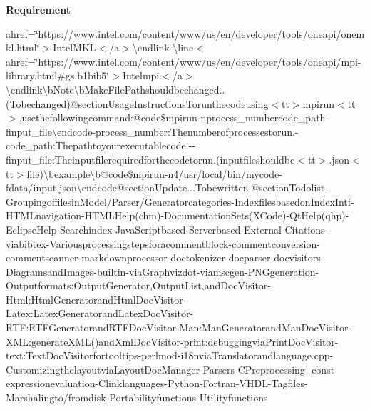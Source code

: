 {\bfseries Requirement} {\bfseries } 
\begin{DoxyItemize}
\item ahref=\char`\"{}https\-://www.\-intel.\-com/content/www/us/en/developer/tools/oneapi/onemkl.\-html\char`\"{}$>$\-IntelM\-K\-L$<$/a$>$\textbackslash{}endlink-\/\textbackslash{}line$<$ahref=\char`\"{}https\-://www.\-intel.\-com/content/www/us/en/developer/tools/oneapi/mpi-\/library.\-html\#gs.\-b1bib5\char`\"{}$>$\-Intelmpi$<$/a$>$\textbackslash{}endlink\textbackslash{}bNote\textbackslash{}bMake\-FilePathshouldbechanged..(\-Tobechanged)@sectionUsageInstructionsTorunthecodeusing$<$tt$>$mpirun$<$tt$>$,usethefollowingcommand\-:@code\$mpirun-\/nprocess\-\_\-numbercode\-\_\-path-\/finput\-\_\-file\textbackslash{}endcode-\/process\-\_\-number\-:Thenumberofprocessestorun.-\/code\-\_\-path\-:Thepathtoyourexecutablecode.-\/-\/finput\-\_\-file\-:Theinputfilerequiredforthecodetorun.(inputfileshouldbe$<$tt$>$.\-json$<$tt$>$file)\textbackslash{}bexample\textbackslash{}b@code\$mpirun-\/n4/usr/local/bin/mycode-\/fdata/input.\-json\textbackslash{}endcode@sectionUpdate...Tobewritten.@sectionTodolist-\/GroupingoffilesinModel/Parser/Generatorcategories-\/IndexfilesbasedonIndex\-Intf-\/H\-T\-M\-Lnavigation-\/H\-T\-M\-LHelp(chm)-\/DocumentationSets(\-X\-Code)-\/QtHelp(qhp)-\/EclipseHelp-\/Searchindex-\/Java\-Scriptbased-\/Serverbased-\/External-\/Citations-\/viabibtex-\/Variousprocessingstepsforacommentblock-\/commentconversion-\/commentscanner-\/markdownprocessor-\/doctokenizer-\/docparser-\/docvisitors-\/DiagramsandImages-\/builtin-\/viaGraphvizdot-\/viamscgen-\/P\-N\-Ggeneration-\/Outputformats\-:Output\-Generator,Output\-List,andDoc\-Visitor-\/Html\-:Html\-GeneratorandHtml\-Doc\-Visitor-\/Latex\-:Latex\-GeneratorandLatex\-Doc\-Visitor-\/R\-T\-F\-:R\-T\-F\-GeneratorandR\-T\-F\-Doc\-Visitor-\/Man\-:Man\-GeneratorandMan\-Doc\-Visitor-\/X\-M\-L\-:generate\-X\-M\-L()andXml\-Doc\-Visitor-\/print\-:debuggingviaPrint\-Doc\-Visitor-\/text\-:Text\-Doc\-Visitorfortooltips-\/perlmod-\/i18nviaTranslatorandlanguage.\-cpp-\/CustomizingthelayoutviaLayout\-Doc\-Manager-\/Parsers-\/CPreprocessing-\/ const expressionevaluation-\/Clinklanguages-\/Python-\/Fortran-\/V\-H\-D\-L-\/Tagfiles-\/Marshalingto/fromdisk-\/Portabilityfunctions-\/Utilityfunctions
\end{DoxyItemize}